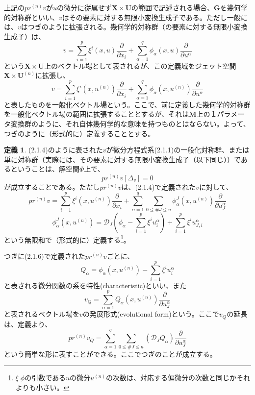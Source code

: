 \documentclass[a4paper, 11pt]{report}
\theoremstyle{definition}
\newtheorem{definition}{定義}[section]
\begin{document}
 上記の$pr^{(n)}v$が$u$の微分に従属せず$\mathbf{X}\times \mathbf{U}$の範囲で記述される場合、$\mathbf{G}$を幾何学的対称群といい、$v$はその要素に対する無限小変換生成子である。ただし一般には、$v$はつぎのように拡張される。幾何学的対称群（の要素に対する無限小変換生成子）は、
\begin{equation}
v = \sum ^p_{i=1}\xi^i(x,u)\frac{\partial }{\partial x_i} + \sum ^q_{\alpha=1}\phi_\alpha(x,u)\frac{\partial }{\partial u^\alpha} %
\end{equation}
という$\mathbf{X}\times \mathbf{U}$上のベクトル場として表されるが、この定義域をジェット空間$\mathbf{X}\times \mathbf{U}^{(n)}$に拡張し、
\begin{equation}
v = \sum ^p_{i=1}\xi^i(x,u^{(n)})\frac{\partial }{\partial x_i} + \sum ^q_{\alpha=1}\phi_\alpha(x,u^{(n)})\frac{\partial }{\partial u^\alpha} %
\end{equation}
と表したものを一般化ベクトル場という。ここで、前に定義した幾何学的対称群を一般化ベクトル場の範囲に拡張することとするが、それは$\mathbf{M}$上の１パラメータ変換群のように、それ自体幾何学的な意味を持つものとはならない。よって、つぎのように（形式的に）定義することとする。

\begin{definition}
 (2.1.4)のように表された$v$が微分方程式系(2.1.1)の一般化対称群、または単に対称群（実際には、その要素に対する無限小変換生成子（以下同じ））であるということは、解空間$\Phi$上で、
\begin{equation}
pr^{(n)}v[\varDelta_v] = 0 %
\end{equation}
が成立することである。ただし$pr^{(n)}v$は、(2.1.4)で定義された$v$に対して、
\begin{equation}
pr^{(n)}v = \sum ^p_{i=1}\xi^i(x,u^{(n)})\frac{\partial }{\partial x_i} + \sum ^q_{\alpha=1}\sum _{0\leq \#J\leq n}\phi_\alpha^J(x,u^{(n)})\frac{\partial }{\partial u^\alpha_J} %
\end{equation}
\begin{equation*}
\phi_\alpha^J(x,u^{(n)}) = \mathcal{D}_J(\phi_\alpha - \sum^p_{i=1}\xi^iu^\alpha_i) + \sum^p_{i=1}\xi^iu^\alpha_{J,i}
\end{equation*}
という無限和で（形式的に）定義する\footnote{$\xi\; \phi$の引数である$u$の微分$u^{(n)}$の次数は、対応する偏微分の次数と同じかそれよりも小さい。}。
\end{definition}

 つぎに(2.1.6)で定義された$pr^{(n)}v$ごとに、
\begin{equation*}
Q_\alpha = \phi_\alpha(x,u^{(n)}) - \sum ^p_{i=1}\xi^iu^\alpha_i
\end{equation*}
と表される微分関数の系を特性(characteristic)といい、また
\begin{equation}
v_Q = \sum ^p_{\alpha=1}Q_\alpha(x,u^{(n)})\frac{\partial }{\partial u^\alpha_J} %
\end{equation}
と表されるベクトル場を$v$の発展形式(evolutional form)という。ここで$v_Q$の延長は、定義より、
\begin{equation*}
pr^{(n)}v_Q = \sum ^q_{\alpha=1}\sum _{0\leq \#J\leq n}(\mathcal{D}_JQ_\alpha)\frac{\partial }{\partial u^\alpha_J}
\end{equation*}
という簡単な形に表すことができる。ここでつぎのことが成立する。
\end{document}
